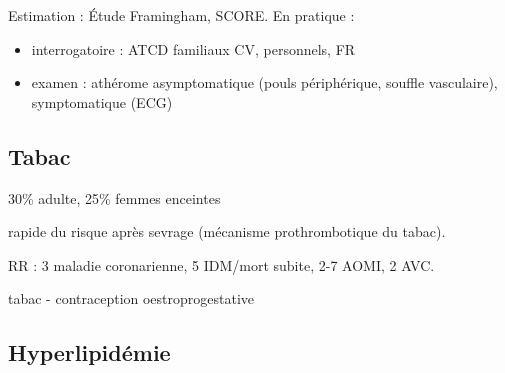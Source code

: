 \documentclass[11pt]{article}
\begin{document}
Estimation : Étude Framingham, SCORE. En pratique : 
\begin{itemize}
\item interrogatoire  : ATCD familiaux CV, personnels, FR
\item examen : athérome asymptomatique (pouls périphérique, souffle vasculaire),
symptomatique (ECG)
\end{itemize}

\subsection{Tabac}
\label{sec:org9f4a6a9}
30\% adulte, 25\% femmes enceintes

\inc rapide du risque après sevrage (mécanisme prothrombotique du tabac). 

RR : 3 maladie coronarienne, 5 IDM/mort subite, 2-7 AOMI, 2 AVC.

\danger tabac - contraception oestroprogestative

\subsection{Hyperlipidémie}
\label{sec:orgc95d5c8}
\end{document}

